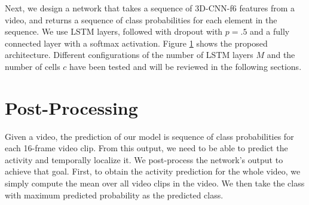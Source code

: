 \documentclass{article}
\begin{document}

Next, we design a network that takes a sequence of 3D-CNN-f6 features from a video, and returns a sequence of class probabilities for each element in the sequence. We use LSTM layers, followed with dropout with $p = .5$ and a fully connected layer with a softmax activation. Figure \ref{} shows the proposed architecture. Different configurations of the number of LSTM layers $M$ and the number of cells $c$ have been tested and will be reviewed in the following sections.




\section{Post-Processing}
Given a video, the prediction of our model is sequence of class probabilities for each 16-frame video clip. From this output, we need to be able to predict the activity  and temporally localize it. We post-process the network's output to achieve that goal. First, to obtain the activity prediction for the whole video, we simply compute the mean over all video clips in the video. We then take the class with maximum predicted probability as the predicted class.
\end{document}
